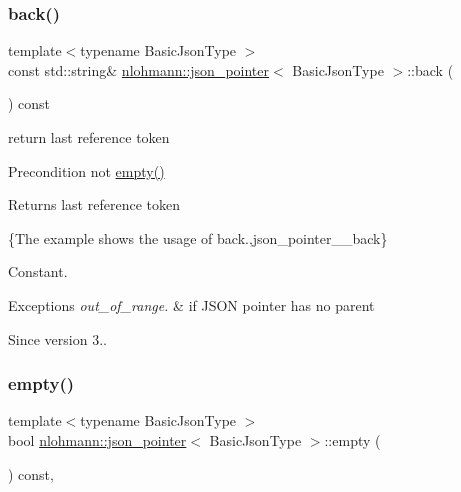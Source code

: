 \subsubsection{\texorpdfstring{back()}{back()}}
{\footnotesize\ttfamily template$<$typename Basic\+Json\+Type $>$ \\
const std\+::string\& \mbox{\hyperlink{classnlohmann_1_1json__pointer}{nlohmann\+::json\+\_\+pointer}}$<$ Basic\+Json\+Type $>$\+::back (\begin{DoxyParamCaption}{ }\end{DoxyParamCaption}) const\hspace{0.3cm}{\ttfamily [inline]}}



return last reference token 

\begin{DoxyPrecond}{Precondition}
not {\ttfamily \mbox{\hyperlink{classnlohmann_1_1json__pointer_a649252bda4a2e75a0915b11a25d8bcc3}{empty()}}} 
\end{DoxyPrecond}
\begin{DoxyReturn}{Returns}
last reference token
\end{DoxyReturn}
\{The example shows the usage of {\ttfamily back}.,json\+\_\+pointer\+\_\+\+\_\+back\}

Constant.


\begin{DoxyExceptions}{Exceptions}
{\em out\+\_\+of\+\_\+range.} & if J\+S\+ON pointer has no parent\\
\hline
\end{DoxyExceptions}
\begin{DoxySince}{Since}
version 3.. 
\end{DoxySince}
\mbox{\label{classnlohmann_1_1json__pointer_a649252bda4a2e75a0915b11a25d8bcc3}} 
\subsubsection{\texorpdfstring{empty()}{empty()}}
{\footnotesize\ttfamily template$<$typename Basic\+Json\+Type $>$ \\
bool \mbox{\hyperlink{classnlohmann_1_1json__pointer}{nlohmann\+::json\+\_\+pointer}}$<$ Basic\+Json\+Type $>$\+::empty (\begin{DoxyParamCaption}{ }\end{DoxyParamCaption}) const\hspace{0.3cm}{\ttfamily [inline]}, {\ttfamily [noexcept]}}



